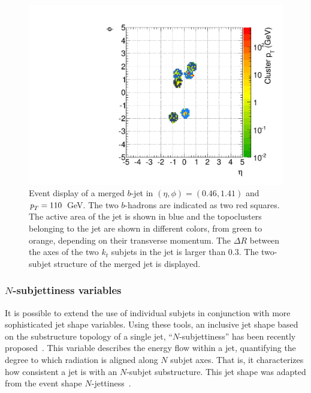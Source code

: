 \begin{figure}[tp]
\centering
\includegraphics[width=1\textwidth]{FIGS/TEMPFigs/EventDisplay7023Cluster_Bs.pdf}
\caption{Event display of a merged $b$-jet in $(\eta,\phi)=(0.46,1.41)$ and ${\emph{p}_{T}} = 110$~GeV. The two $b$-hadrons are indicated as two red squares. The active area of the jet is shown in blue and the topoclusters belonging to the jet are shown in different colors, from green to orange, depending on their transverse momentum. The $\Delta R$ between the axes of the two $k_t$ subjets in the jet is larger than 0.3. The two-subjet structure of the merged jet is displayed.}
\label{fig:ED}
\end{figure}



\subsubsection{$N$-subjettiness variables} 

It is possible to extend the use of individual subjets in conjunction with more sophisticated jet shape variables. Using these tools, an inclusive jet shape based on the substructure topology of a single jet, ``$N$-subjettiness'' has been recently proposed~\cite{nsubjettiness}. This variable describes the energy flow within a jet, quantifying the degree to which radiation is aligned along $N$ subjet axes. That is, it characterizes how consistent a jet is with an $N$-subjet substructure. This jet shape was adapted from the event shape $N$-jettiness~\cite{njetti}.

